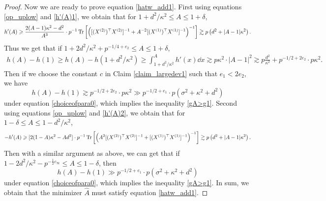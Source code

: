 \begin{proof}



Now we are ready to prove equation \eqref{hatw_add1}. First using equations \eqref{op_uplow} and  \eqref{h'(A)1}, we obtain that for $1+d^2/\kappa^2 \le A\le 1+\delta$,
$$h'(A)\geqslant \frac{2(A-1)\kappa^2 - d^2}{A^3} \cdot p^{-1} \operatorname{Tr}\left[\left([(X^{(2)})^\top X^{(2)}]^{-1} + A^{-2} [(X^{(1)})^\top X^{(1)}]^{-1}\right)^{-1}\right] \gtrsim p\left(d^2 + |A-1|\kappa^2\right).$$
Thus we get that if $1+2d^2/\kappa^2 +p^{-1/4+e_2}\le A\le 1+\delta$,
\begin{align*}
h(A)-h(1)\ge h(A)-h(1+d^2/\kappa^2) \ge \int_{1+d^2/\kappa^2}^A h'(x)\dd x \gtrsim p\kappa^2 \cdot |A-1|^2  \gtrsim p\frac{d^2}{\kappa^2} + p^{-1/2+2e_2}\cdot p\kappa^2.
\end{align*}
Then if we choose the constant $c$ in Claim \ref{claim_largedev1} such that $e_1<2e_2$, we have 
$$ h(A)-h(1)\gtrsim  p^{-1/2+2e_2}\cdot p\kappa^2 \gg p^{-1/2+e_1}\cdot p\left(\sigma^2 +\kappa^2+d^2 \right)$$
under equation \eqref{choiceofpara0}, which implies the inequality \eqref{gA>g1}. Second using equations \eqref{op_uplow} and  \eqref{h'(A)2}, we obtain that for $1-\delta \le A \le 1-d^2/\kappa^2$,
$$- h'(A)\geqslant  [2(1-A)\kappa^2 - Ad^2] \cdot p^{-1} \operatorname{Tr}\left[\left(A^2[(X^{(2)})^\top X^{(2)}]^{-1} + [(X^{(1)})^\top X^{(1)}]^{-1}\right)^{-1}\right]  \gtrsim p\left(d^2 + |A-1|\kappa^2\right).$$
Then with a similar argument as above, we can get that if $1-2d^2/\kappa^2 - p^{-\frac12c_\infty}\le A\le 1-\delta$, then 
$$ h(A)-h(1) \gg p^{-1/2+e_1}\cdot p\left(\sigma^2 +\kappa^2+d^2 \right)$$
under equation \eqref{choiceofpara0}, which implies the inequality \eqref{gA>g1}. In sum, we obtain that the minimizer $\hat A$ must satisfy equation \eqref{hatw_add1}.

\end{proof}
